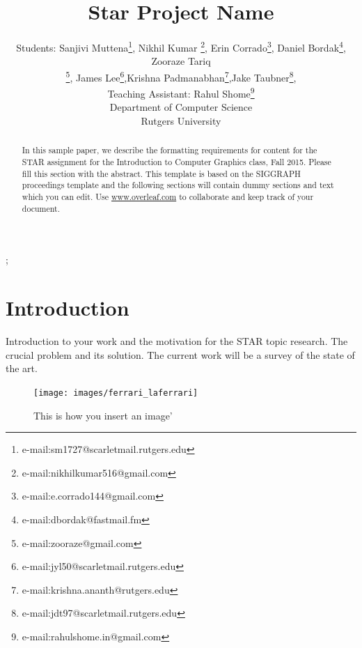 \documentclass[tog]{acmsiggraph}
\title{Star Project Name}
\author{Students: Sanjivi Muttena\thanks{e-mail:sm1727@scarletmail.rutgers.edu}, Nikhil Kumar \thanks{e-mail:nikhilkumar516@gmail.com}, Erin Corrado\thanks{e-mail:e.corrado144@gmail.com}, Daniel Bordak\thanks{e-mail:dbordak@fastmail.fm}, Zooraze Tariq \\ \thanks{e-mail:zooraze@gmail.com}, James Lee\thanks{e-mail:jyl50@scarletmail.rutgers.edu},Krishna Padmanabhan\thanks{e-mail:krishna.ananth@rutgers.edu},Jake Taubner\thanks{e-mail:jdt97@scarletmail.rutgers.edu}, \\ Teaching Assistant: Rahul Shome\thanks{e-mail:rahulshome.in@gmail.com}\\Department of Computer Science\\ Rutgers University}
\begin{document}


\maketitle

\begin{abstract}

In this sample paper, we describe the formatting requirements for
content for the STAR assignment for the Introduction to Computer Graphics class, Fall 2015. Please fill this section with the abstract. This template is based on the SIGGRAPH proceedings template and the following sections will contain dummy sections and text which you can edit.
Use \url{www.overleaf.com} to collaborate and keep track of your document.

\end{abstract}

\begin{CRcatlist}
  ;
\end{CRcatlist}

\keywordlist



\section{Introduction}

Introduction to your work and the motivation for the STAR topic research. The crucial problem and its solution. The current work will be a survey of the state of the art.
\begin{figure}[h]
	\centering
	\texttt{[image: images/ferrari\_laferrari]}
	\caption{This is how you insert an image'}
	\label{fig:ferrari}
\end{figure}
\end{document}
